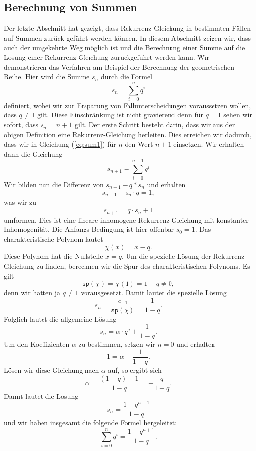 \subsection{Berechnung von Summen}
Der letzte Abschnitt hat gezeigt, dass Rekurrenz-Gleichung in bestimmten F\"allen auf Summen zur\"uck gef\"uhrt
werden k\"onnen.  In diesem Abschnitt zeigen wir, dass auch der umgekehrte Weg m\"oglich ist und die  
Berechnung einer Summe auf die L\"osung einer Rekurrenz-Gleichung zur\"uckgef\"uhrt werden kann. Wir
demonstrieren das Verfahren am Beispiel der Berechnung der geometrischen Reihe.  Hier wird die Summe
$s_n$ durch die Formel
\begin{equation}
  \label{eq:sum1}
  s_n = \sum\limits_{i=0}^n q^i   
\end{equation}
definiert, wobei wir zur Ersparung von Fallunterscheidungen voraussetzen wollen, dass $q \not= 1$ gilt.
Diese Einschr\"ankung ist nicht gravierend denn f\"ur $q=1$ sehen wir sofort, dass $s_n = n+1$ gilt. Der
erste Schritt besteht darin, dass wir aus der obigen Definition eine Rekurrenz-Gleichung herleiten.
Dies erreichen wir dadurch, dass wir in Gleichung (\ref{eq:sum1}) f\"ur $n$ den Wert $n+1$ einsetzen.  Wir
erhalten dann die Gleichung
\begin{equation}
  \label{eq:sum2}
  s_{n+1} = \sum\limits_{i=0}^{n+1} q^i    
\end{equation}
Wir bilden nun die Differenz von $s_{n+1} - q * s_n$ und erhalten
\[ s_{n+1} - s_n \cdot q = 1, \]
was wir zu
\[ s_{n+1} = q \cdot s_n + 1 \]
umformen.  Dies ist eine lineare inhomogene Rekurrenz-Gleichung mit konstanter Inhomogenit\"at. 
Die Anfangs-Bedingung ist hier offenbar $s_0 = 1$.  Das charakteristische Polynom lautet
\[ \chi(x) = x - q. \]
Diese Polynom hat die Nullstelle $x = q$.  Um die spezielle L\"osung der Rekurrenz-Gleichung zu finden,
berechnen wir die Spur des charakteristischen Polynoms.  Es gilt
\[ \mathtt{sp}(\chi) = \chi(1) = 1 - q \not= 0, \]  
denn wir hatten ja $q \not= 1$ vorausgesetzt.  Damit lautet die spezielle L\"osung
\[ s_n = \frac{c_{-1}}{\mathtt{sp}(\chi)} = \frac{1}{1 - q}. \]
Folglich lautet die allgemeine L\"osung
\[ s_n = \alpha \cdot q^n + \frac{1}{1 - q}.  \]
Um den Koeffizienten $\alpha$ zu bestimmen, setzen wir $n=0$ und erhalten
\[ 1 = \alpha + \frac{1}{1 - q}. \]
L\"osen wir diese Gleichung nach $\alpha$ auf, so ergibt sich
\[ \alpha = \frac{(1 - q) - 1}{1 - q} = - \frac{q}{1 - q}. \]
Damit lautet die L\"osung
\[ s_n = \frac{1 - q^{n+1}}{1 - q} \]
und wir haben insgesamt die folgende Formel hergeleitet:
\[ \sum\limits_{i=0}^{n} q^i = \frac{1 - q^{n+1}}{1 - q}. \]
\pagebreak

